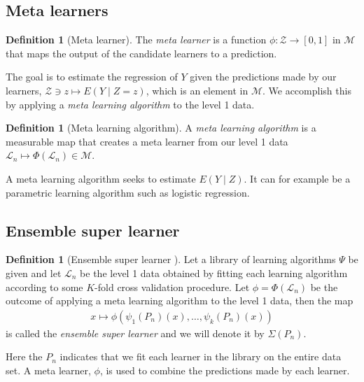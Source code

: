 \documentclass[11pt, a4paper]{article}
\theoremstyle{definition}
\newtheorem{definition}[theorem]{Definition}
\theoremstyle{remark}
\newcommand{\la}{\psi}
\newcommand{\lib}{\Psi}
\newcommand{\lone}{\mathcal{L}}
\newcommand{\meta}{\phi}
\newcommand{\Meta}{\Phi}
\newcommand{\esl}{\Sigma}
\begin{document}
\subsection{Meta learners}
\begin{definition}[Meta learner]
    The \textit{meta learner} is a function $ \meta: \mathcal{Z} \to [0,1] $ in $ \mathcal{M} $ that maps the output of the candidate learners to a prediction. 
\end{definition}
The goal is to estimate the regression of $ Y $ given the predictions made by our learners, $ \mathcal{Z} \ni z \mapsto E(Y \mid Z = z) $, which is an element in $ \mathcal{M} $. We accomplish this by applying a \textit{meta learning algorithm} to the level 1 data. 
\begin{definition}[Meta learning algorithm]
    A \textit{meta learning algorithm} is a measurable map that creates a meta learner from our level 1 data $ \lone_{n} \mapsto \Meta(\lone_{n}) \in \mathcal{M} $. 
\end{definition}
A meta learning algorithm seeks to estimate $ E (Y \mid Z) $. It can for example be a parametric learning algorithm such as logistic regression. 

\subsection{Ensemble super learner}
\begin{definition}[Ensemble super learner \parencite{van2007super}]
    Let a library of learning algorithms $ \lib $ be given and let $ \lone_{n} $ be the level 1 data obtained by fitting each learning algorithm according to some $ K $-fold cross validation procedure. Let $ \meta = \Meta(\lone_{n}) $ be the outcome of applying a meta learning algorithm to the level 1 data, then the map 
    \begin{align*}
       x \mapsto \meta(\la_1(P_{n})(x), \ldots, \la_k(P_{n})(x) )
    \end{align*}
    is called the \textit{ensemble super learner} and we will denote it by $ \esl(P_{n}) $. 
\end{definition}
Here the $ P_n $ indicates that we fit each learner in the library on the entire data set. A meta learner, $ \meta $, is used to combine the predictions made by each learner. 
\end{document}

